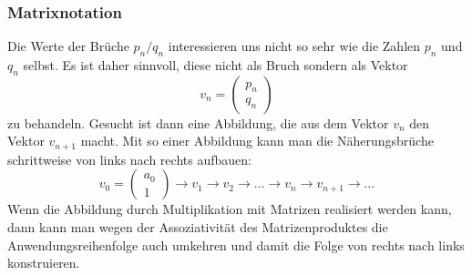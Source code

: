\subsubsection{Matrixnotation}
Die Werte der Brüche $p_n/q_n$ interessieren uns nicht so sehr wie
die Zahlen $p_n$ und $q_n$ selbst.
Es ist daher sinnvoll, diese nicht als Bruch sondern als Vektor
\[
v_n = \begin{pmatrix} p_n\\q_n\end{pmatrix}
\]
zu behandeln.
Gesucht ist dann eine Abbildung, die aus dem Vektor $v_n$ den Vektor
$v_{n+1}$ macht.
Mit so einer Abbildung kann man die Näherungsbrüche schrittweise
von links nach rechts aufbauen:
\[
v_0 =\begin{pmatrix}a_0\\1\end{pmatrix}
\rightarrow
v_1
\rightarrow
v_2
\rightarrow
\dots
\rightarrow
v_{n}
\rightarrow
v_{n+1}
\rightarrow
\dots
\]
Wenn die Abbildung durch Multiplikation mit Matrizen realisiert werden
kann, dann kann man wegen der Assoziativität des Matrizenproduktes
die Anwendungsreihenfolge auch umkehren und damit die Folge von rechts
nach links konstruieren.

